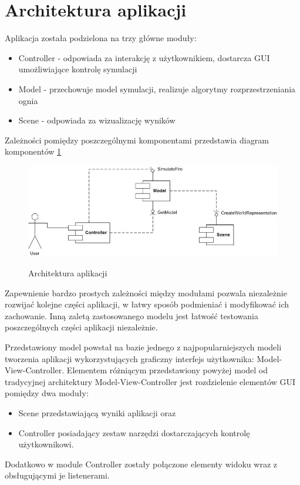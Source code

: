 \section {Architektura aplikacji}
Aplikacja została podzielona na trzy główne moduły:
\begin{itemize}
\item Controller - odpowiada za interakcję z użytkownikiem, dostarcza GUI umożliwiające kontrolę symulacji
\item Model - przechowuje model symulacji, realizuje algorytmy rozprzestrzeniania ognia
\item Scene - odpowiada za wizualizację wyników
\end{itemize}
Zależności pomiędzy poszczególnymi komponentami przedstawia diagram komponentów \ref{architektura aplikacji}
\begin{figure}
\begin {center}
\includegraphics{componentDiagram.jpg} \\
\caption { Architektura aplikacji}
\label {architektura aplikacji}
\end {center}
\end{figure}
Zapewnienie bardzo prostych zależności między modułami pozwala niezależnie rozwijać kolejne części aplikacji, w łatwy
sposób podmieniać i modyfikować ich zachowanie. Inną zaletą zastosowanego modelu jest łatwość
testowania poszczególnych części aplikacji niezależnie.

Przedstawiony model powstał na bazie jednego z najpopularniejszych modeli tworzenia aplikacji wykorzystujących graficzny interfejs użytkownika: Model-View-Controller. Elementem różniącym przedstawiony powyżej model od tradycyjnej architektury Model-View-Controller
jest rozdzielenie elementów GUI pomiędzy dwa moduły:
\begin{itemize}
\item Scene przedstawiającą wyniki aplikacji oraz
\item Controller posiadający zestaw narzędzi dostarczających kontrolę użytkownikowi.
\end {itemize}
Dodatkowo w module Controller zostały połączone elementy widoku wraz z obsługującymi je listenerami.
